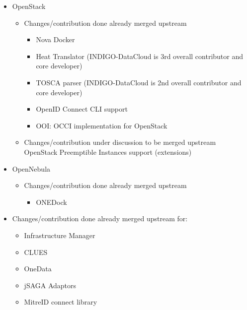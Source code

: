 \documentclass{article}
\begin{document}


\begin{itemize}
\item OpenStack
\begin{itemize}
\item Changes/contribution done already merged upstream
\begin{itemize}
\item Nova Docker
\item Heat Translator (INDIGO-DataCloud is 3rd overall contributor and core developer)
\item TOSCA parser (INDIGO-DataCloud is 2nd overall contributor and core developer)
\item OpenID Connect CLI support
\item OOI: OCCI implementation for OpenStack
\end{itemize}
\item Changes/contribution under discussion to be merged upstream
OpenStack Preemptible Instances support (extensions)
\end{itemize}
\item OpenNebula
\begin{itemize}
\item Changes/contribution done already merged upstream
\begin{itemize}
\item ONEDock
\end{itemize}
\end{itemize}
\item Changes/contribution done already merged upstream for:
\begin{itemize}
\item Infrastructure Manager
\item CLUES
\item OneData
\item jSAGA Adaptors
\item MitreID connect library
\end{itemize}
\end{itemize}


\end{document}
